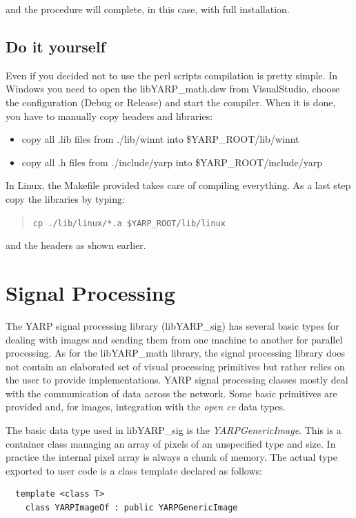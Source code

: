 \noindent and the procedure will complete, in this case, with full installation.


\subsection{Do it yourself}
Even if you decided not to use the perl scripts compilation is pretty simple. In Windows you need to open the libYARP\_math.dsw from VisualStudio, choose the configuration (Debug or Release) and start the compiler. When it is done, you have to manually copy headers and libraries:
\begin{itemize}
\item copy all .lib files from ./lib/winnt into \$YARP\_ROOT/lib/winnt
\item copy all .h files from ./include/yarp into \$YARP\_ROOT/include/yarp
\end{itemize}

In Linux, the Makefile provided takes care of compiling everything. As a last step copy the libraries by typing:
\begin{quote}
{\tt cp ./lib/linux/*.a \$YARP\_ROOT/lib/linux}
\end{quote}

\noindent and the headers as shown earlier. 



\section{Signal Processing}
The YARP signal processing library (libYARP\_sig) has several basic types for dealing with images and sending them from one machine to another for parallel processing. As for the libYARP\_math library, the signal processing library does not contain an elaborated set of visual processing primitives but rather relies on the user to provide implementations. YARP signal processing classes mostly deal with the communication of data across the network. Some basic primitives are provided and, for images, integration with the {\em open cv} data types.

The basic data type used in libYARP\_sig is the {\em YARPGenericImage}. This is a container class managing an array of pixels of an unspecified type and size. In practice the internal pixel array is always a chunk of memory. The actual type exported to user code is a class template declared as follows:

\begin{verbatim}
  template <class T>
    class YARPImageOf : public YARPGenericImage
\end{verbatim}

